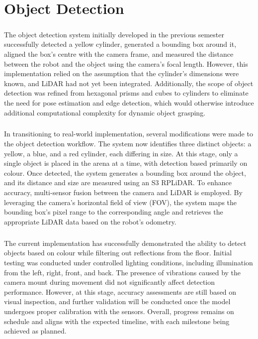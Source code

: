 \chapter{Object Detection}

\paragraph*{}
The object detection system initially developed in the previous semester successfully detected a yellow cylinder, generated a bounding box around it, aligned the box’s centre with the camera frame, and measured the distance between the robot and the object using the camera’s focal length. However, this implementation relied on the assumption that the cylinder’s dimensions were known, and LiDAR had not yet been integrated. Additionally, the scope of object detection was refined from hexagonal prisms and cubes to cylinders to eliminate the need for pose estimation and edge detection, which would otherwise introduce additional computational complexity for dynamic object grasping.

\paragraph*{}
In transitioning to real-world implementation, several modifications were made to the object detection workflow. The system now identifies three distinct objects: a yellow, a blue, and a red cylinder, each differing in size. At this stage, only a single object is placed in the arena at a time, with detection based primarily on colour. Once detected, the system generates a bounding box around the object, and its distance and size are measured using an S3 RPLiDAR. To enhance accuracy, multi-sensor fusion between the camera and LiDAR is employed. By leveraging the camera’s horizontal field of view (FOV), the system maps the bounding box’s pixel range to the corresponding angle and retrieves the appropriate LiDAR data based on the robot’s odometry.

\paragraph*{}
The current implementation has successfully demonstrated the ability to detect objects based on colour while filtering out reflections from the floor. Initial testing was conducted under controlled lighting conditions, including illumination from the left, right, front, and back. The presence of vibrations caused by the camera mount during movement did not significantly affect detection performance. However, at this stage, accuracy assessments are still based on visual inspection, and further validation will be conducted once the model undergoes proper calibration with the sensors. Overall, progress remains on schedule and aligns with the expected timeline, with each milestone being achieved as planned.

